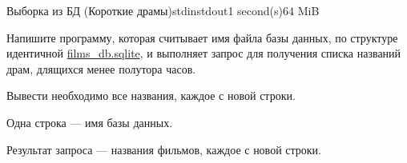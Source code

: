\begin{problem}{Выборка из БД (Короткие драмы)}{stdin}{stdout}{1 second(s)}{64 MiB}

Напишите программу, которая считывает имя файла базы данных, по структуре идентичной 
\href{https://yadi.sk/d/U9oZVrIBa5O0Kg}{films_db.sqlite}, 
и выполняет запрос для получения списка названий драм, длящихся менее полутора часов.

Вывести необходимо все названия, каждое с новой строки. 

\InputFile
Одна строка — имя базы данных.

\OutputFile
Результат запроса — названия фильмов, каждое с новой строки.

\end{problem}
